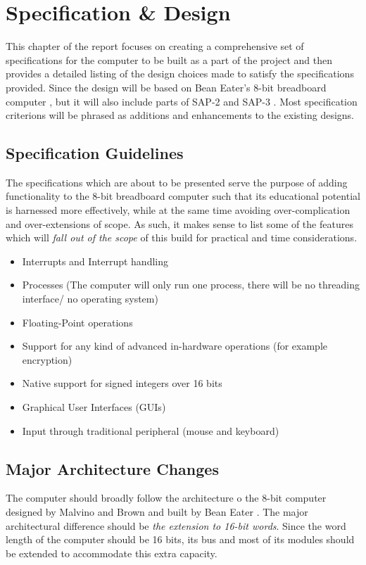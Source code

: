 \chapter{Specification \& Design}
This chapter of the report focuses on creating a comprehensive set of specifications for the computer
to be built as a part of the project and then provides a detailed listing of the design choices made to satisfy
the specifications provided. Since the design will be based on Bean Eater's 8-bit breadboard computer \cite{eater2019breadboard}, but it will also include parts of SAP-2 and SAP-3 \cite{malvino1992digital}. Most specification criterions will be phrased as additions and enhancements to the existing designs.

\section{Specification Guidelines}
The specifications which are about to be presented serve the purpose of adding functionality to the 8-bit breadboard computer such
that its educational potential is harnessed more effectively, while at the same time avoiding over-complication and over-extensions
of scope. As such, it makes sense to list some of the features which will \emph{fall out of the scope} of this build for practical
and time considerations.
\begin{itemize}
  \item Interrupts and Interrupt handling
  \item Processes (The computer will only run one process, there will be no threading interface/ no operating system)
  \item Floating-Point operations
  \item Support for any kind of advanced in-hardware operations (for example encryption)
  \item Native support for signed integers over 16 bits
  \item Graphical User Interfaces (GUIs)
  \item Input through traditional peripheral (mouse and keyboard)
\end{itemize}

\section{Major Architecture Changes}
The computer should broadly follow the architecture o the 8-bit computer designed by Malvino and Brown \cite{malvino1992digital} and built by Bean Eater \cite{eater2019breadboard}. The major architectural difference should be \emph{the extension to 16-bit words}.
Since the word length of the computer should be 16 bits, its bus and most of its modules should be extended to accommodate this extra capacity.

